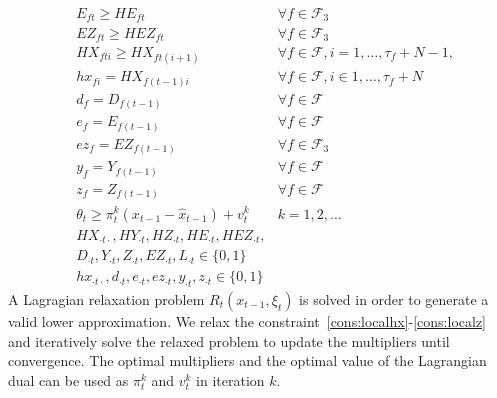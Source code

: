 \documentclass[12pt]{article}
\begin{document}
\begin{subequations}
\begin{align}
			& E_{ft} \geq HE_{ft} & \forall f \in \mathcal{F}_3 \label{cons:transEtr}\\
			& EZ_{ft} \geq HEZ_{ft} & \forall f \in \mathcal{F}_3 \label{cons:transEZtr}\\
			& HX_{fti} \geq HX_{ft(i+1)} & \forall f \in \mathcal{F}, i = 1, \dots, \tau_{f} + N -1, \label{cons:transHXtr}\\
			& hx_{fi} = HX_{f(t-1)i}& \forall f \in \mathcal{F}, i \in 1, \dots, \tau_{f} + N \label{cons:localhx} \\
			& d_{f} = D_{f(t-1)} & \forall f \in \mathcal{F} \label{cons:locald}\\
			& e_{f} = E_{f(t-1)} & \forall f \in \mathcal{F} \label{cons:locale}\\
			& ez_{f} = EZ_{f(t-1)} & \forall f \in \mathcal{F}_3 \label{cons:localez}\\
			& y_{f} = Y_{f(t-1)} & \forall f \in \mathcal{F} \label{cons:localy}\\
			& z_{f} = Z_{f(t-1)} & \forall f \in \mathcal{F} \label{cons:localz}\\
			& \theta_t \geq \pi_t^k(x_{t-1} - \hat{x}_{t-1}) + v_t^k & k = 1, 2, \dots \label{cons:cuts}\\
			& HX_{\cdot t \cdot}, HY_{\cdot t}, HZ_{\cdot t}, HE_{\cdot t}, HEZ_{\cdot t},& \nonumber\\ 
			&D_{\cdot t}, Y_{\cdot t}, Z_{\cdot t}, EZ_{\cdot t}, L_{\cdot t} \in \{0,1\}& \label{cons:binaryr}\\
			& hx_{\cdot t \cdot}, d_{\cdot t}, e_{\cdot t}, ez_{\cdot t}, y_{\cdot t}, z_{\cdot t} \in \{0,1\}& 
		\end{align}
	\end{subequations}
	A Lagragian relaxation problem \(R_t(x_{t-1},\xi_t)\) is solved in order to generate a valid lower approximation. We relax the constraint~\eqref{cons:localhx}-\eqref{cons:localz} and iteratively solve the relaxed problem to update the multipliers until convergence. The optimal multipliers and the optimal value of the Lagrangian dual can be used as \(\pi_t^k\) and \(v_t^k\) in iteration \(k\).
\end{document}
